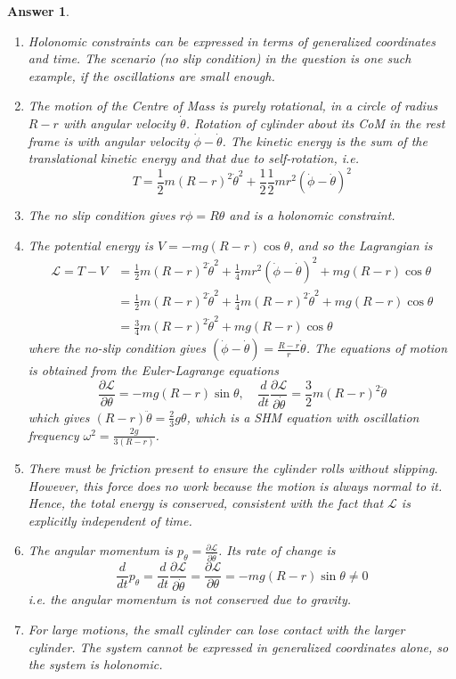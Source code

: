 \documentclass[a4paper]{article}
\newtheorem{ans}{Answer}[section]
\theoremstyle{new}
\begin{document}
\begin{ans}\leavevmode
\begin{enumerate}[label=(\alph*)]
\item Holonomic constraints can be expressed in terms of generalized coordinates and time. The scenario (no slip condition) in the question is one such example, if the oscillations are small enough.
\item The motion of the Centre of Mass is purely rotational, in a circle of radius $R-r$ with angular velocity $\dot{\theta}$. Rotation of cylinder about its CoM in the rest frame is with angular velocity $\dot{\phi}-\dot{\theta}$. The kinetic energy is the sum of the translational kinetic energy and that due to self-rotation, i.e.
$$T=\frac{1}{2}m(R-r)^2\dot{\theta}^2+\frac{1}{2}\frac{1}{2}mr^2(\dot{\phi}-\dot{\theta})^2$$
\item The no slip condition gives $r\phi=R\theta$ and is a holonomic constraint.
\item The potential energy is $V=-mg(R-r)\cos\theta$, and so the Lagrangian is
\begin{align}
\mathcal{L}=T-V&=\frac{1}{2}m(R-r)^2\dot{\theta}^2+\frac{1}{4}mr^2(\dot{\phi}-\dot{\theta})^2+mg(R-r)\cos\theta\nonumber\\&=\frac{1}{2}m(R-r)^2\dot{\theta}^2+\frac{1}{4}m(R-r)^2\dot{\theta}^2+mg(R-r)\cos\theta\nonumber\\&=\frac{3}{4}m(R-r)^2\dot{\theta}^2+mg(R-r)\cos\theta\nonumber
\end{align}
where the no-slip condition gives $(\dot{\phi}-\dot{\theta})=\frac{R-r}{r}\dot{\theta}$. The equations of motion is obtained from the Euler-Lagrange equations
$$\frac{\partial\mathcal{L}}{\partial\theta}=-mg(R-r)\sin\theta,\quad\frac{d}{dt}\frac{\partial\mathcal{L}}{\partial\dot{\theta}}=\frac{3}{2}m(R-r)^2\ddot{\theta}$$
which gives $(R-r)\ddot{\theta}=\frac{2}{3}g\theta$, which is a SHM equation with oscillation frequency $\omega^2=\frac{2g}{3(R-r)}$.
\item There must be friction present to ensure the cylinder rolls without slipping. However, this force does no work because the motion is always normal to it. Hence, the total energy is conserved, consistent with the fact that $\mathcal{L}$ is explicitly independent of time.
\item The angular momentum is $p_\theta=\frac{\partial\mathcal{L}}{\partial\dot{\theta}}$. Its rate of change is
$$\frac{d}{dt}p_\theta=\frac{d}{dt}\frac{\partial\mathcal{L}}{\partial\dot{\theta}}=\frac{\partial\mathcal{L}}{\partial\theta}=-mg(R-r)\sin\theta\neq 0$$
i.e. the angular momentum is not conserved due to gravity.
\item For large motions, the small cylinder can lose contact with the larger cylinder. The system cannot be expressed in generalized coordinates alone, so the system is holonomic.
\end{enumerate}
\end{ans}
\end{document}
